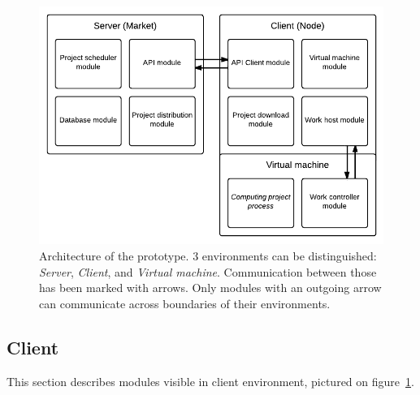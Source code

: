 \begin{figure}
\centering
\includegraphics{diagrams/Architecture.pdf}
\caption{Architecture of the prototype. 3 environments can be distinguished: \emph{Server}, \emph{Client}, and \emph{Virtual machine}. Communication between those has been marked with arrows. Only modules with an outgoing arrow can communicate across boundaries of their environments.}
\label{f:arch}
\end{figure}

\subsection{Client}

This section describes modules visible in client environment, pictured on figure~\ref{f:arch}.

